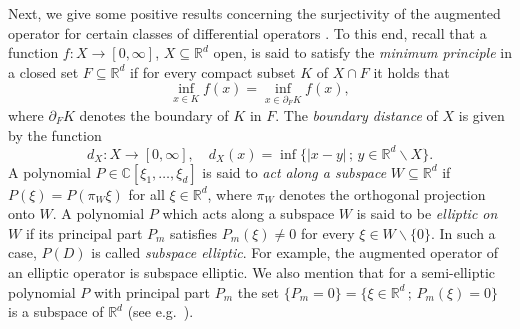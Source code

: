 \documentclass[12pt]{amsart}
\newcommand{\R}{\mathbb{R}}
\newcommand{\C}{\mathbb{C}}
\theoremstyle{definition}
\theoremstyle{remark}
\numberwithin{equation}{section}
\begin{document}
Next, we give some positive results concerning the surjectivity of the augmented operator for certain classes of differential operators \cite{Kalmes12-3, Kalmes19}. To this end,  recall that a function $f:X\rightarrow[0,\infty]$, $X\subseteq\R^d$ open, is said to satisfy the \emph{minimum principle} in a closed set $F\subseteq\R^d$ if for every compact subset $K$ of $X\cap F$ it holds that
$$\inf_{x\in K}f(x)=\inf_{x\in\partial_F K}f(x),$$
where $\partial_F K$ denotes the boundary of $K$ in $F$.  The  \emph{boundary distance} of $X$ is given by the  function 
$$
d_X:X\rightarrow [0,\infty], \quad d_X(x)=\inf\{|x-y| \, ; \, y\in\R^d\backslash X\}.
$$ 
A polynomial $P\in\C[\xi_1,\ldots,\xi_d]$ is said to \emph{act along a  subspace} $W\subseteq\R^d$ if $P(\xi)=P(\pi_W\xi)$ for all $\xi\in\R^d$, where $\pi_W$ denotes the orthogonal projection  onto $W$. A polynomial $P$ which acts along a subspace $W$ is said to be \emph{elliptic on} $W$ if its principal part $P_m$ satisfies $P_m(\xi)\neq 0$ for every $\xi\in W\backslash\{0\}$. In such a case, $P(D)$ is called \emph{subspace elliptic}. For example, the augmented operator of an elliptic operator is subspace elliptic.  We also mention that for a semi-elliptic polynomial $P$ with principal part $P_m$ the set $\{P_m=0\}=\{\xi\in\R^d \,; \, P_m(\xi)=0\}$ is a subspace of $\R^d$ (see e.g.\ \cite[Proposition 2(iii)]{FrKa}).
 
\end{document}
